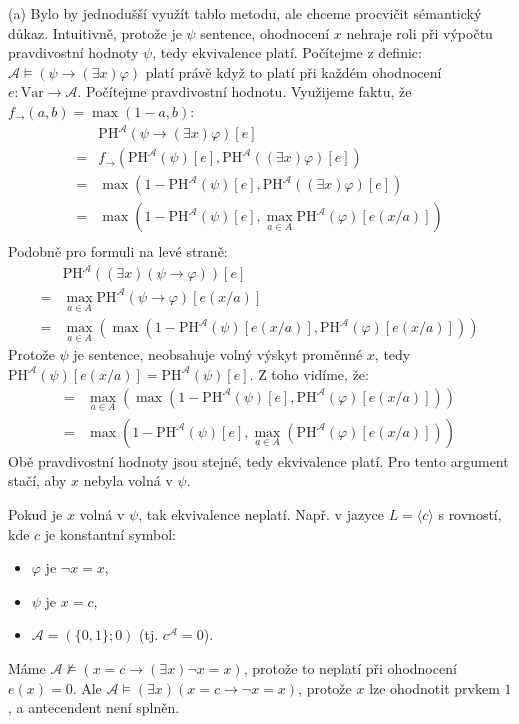 \begin{problem}
\begin{solution}
        (a) Bylo by jednodušší využít tablo metodu, ale chceme procvičit sémantický důkaz. Intuitivně, protože je $\psi$ sentence, ohodnocení $x$ nehraje roli při výpočtu pravdivostní hodnoty $\psi$, tedy ekvivalence platí. Počítejme z definic: $\mathcal{A}\models (\psi \to (\exists x)\varphi)$ platí právě když to platí při každém ohodnocení $e:\mathrm{Var}\to\mathcal A$. Počítejme pravdivostní hodnotu. Využijeme faktu, že $f_\to(a,b)=\max(1-a,b)$:
            \begin{align*}
                &\mathrm{PH}^\mathcal A(\psi \to (\exists x)\varphi)[e]\\
                =&f_\to(\mathrm{PH}^\mathcal A(\psi)[e], \mathrm{PH}^\mathcal A((\exists x)\varphi)[e])\\
                =&\max(1-\mathrm{PH}^\mathcal A(\psi)[e], \mathrm{PH}^\mathcal A((\exists x)\varphi)[e])\\
                =&\max(1-\mathrm{PH}^\mathcal A(\psi)[e], \max_{a\in A}\mathrm{PH}^\mathcal A(\varphi)[e(x/a)])\\                
            \end{align*}
            Podobně pro formuli na levé straně:
            \begin{align*}
                &\mathrm{PH}^\mathcal A((\exists x)(\psi \to \varphi))[e]\\
                =&\max_{a\in A}\mathrm{PH}^\mathcal A(\psi \to \varphi)[e(x/a)]\\
                =&\max_{a\in A}(\max(1-\mathrm{PH}^\mathcal A(\psi)[e(x/a)], \mathrm{PH}^\mathcal A(\varphi)[e(x/a)]))
            \end{align*}
            Protože $\psi$ je sentence, neobsahuje volný výskyt proměnné $x$, tedy $\mathrm{PH}^\mathcal A(\psi)[e(x/a)]=\mathrm{PH}^\mathcal A(\psi)[e]$. Z toho vidíme, že:
            \begin{align*}
                =&\max_{a\in A}(\max(1-\mathrm{PH}^\mathcal A(\psi)[e], \mathrm{PH}^\mathcal A(\varphi)[e(x/a)]))\\
                =&\max(1-\mathrm{PH}^\mathcal A(\psi)[e], \max_{a\in A}(\mathrm{PH}^\mathcal A(\varphi)[e(x/a)]))
            \end{align*}
            Obě pravdivostní hodnoty jsou stejné, tedy ekvivalence platí. Pro tento argument stačí, aby $x$ nebyla volná v $\psi$. 
            
            Pokud je $x$ volná v $\psi$, tak ekvivalence neplatí. Např. v jazyce $L=\langle c\rangle$ s rovností, kde $c$ je konstantní symbol:
            \begin{itemize}
                \item $\varphi$ je $\neg x=x$,
                \item $\psi$ je $x=c$,
                \item $\mathcal A=(\{0,1\};0)$ (tj. $c^\mathcal A=0$).
            \end{itemize}
            Máme $\mathcal A\not\models (x=c\to (\exists x) \neg x=x)$, protože to neplatí při ohodnocení $e(x)=0$. Ale $\mathcal A\models(\exists x)(x=c\to \neg x=x)$, protože $x$ lze ohodnotit prvkem $1$, a antecendent není splněn.


\end{solution}
\end{problem}
